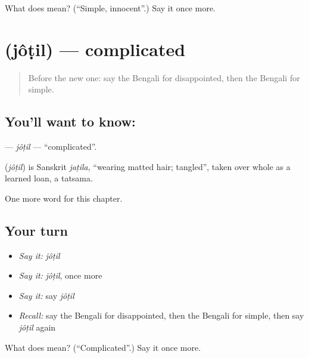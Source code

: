 \begin{tcolorbox}[breakable,colback=teal!4,colframe=teal!35!black,title={Before you move on}]
What does  mean? (\textquotedblleft{}Simple, innocent\textquotedblright{}.) Say it once more.
\end{tcolorbox}
\section[\texorpdfstring{\bn{জটিল} (jôṭil)}{জটিল (jôṭil)}]{ (jôṭil) — complicated}

\label{lesson:BN-C192-jotil}



\begin{quote}
Before the new one: say the Bengali for disappointed, then the Bengali for simple.
\end{quote}

\subsection*{You'll want to know: }
\textbf{} — \emph{jôṭil} — \textquotedblleft{}complicated\textquotedblright{}.

\begin{cousinweb}
\textbf{} (\emph{jôṭil}) is Sanskrit \emph{jaṭila}, \textquotedblleft{}wearing matted hair; tangled\textquotedblright{}, taken over whole as a learned loan, a tatsama.
\end{cousinweb}

\begin{grammarlens}[title={What you've built}]
One more word for this chapter.
\end{grammarlens}

\subsection*{Your turn}
\begin{itemize}
\raggedright
  \item \emph{Say it:} \emph{jôṭil}
  \item \emph{Say it:} \emph{jôṭil}, once more
  \item \emph{Say it:} say \emph{jôṭil}
  \item \emph{Recall:} say the Bengali for disappointed, then the Bengali for simple, then say \emph{jôṭil} again
\end{itemize}

\begin{tcolorbox}[breakable,colback=teal!4,colframe=teal!35!black,title={Before you move on}]
What does  mean? (\textquotedblleft{}Complicated\textquotedblright{}.) Say it once more.
\end{tcolorbox}
